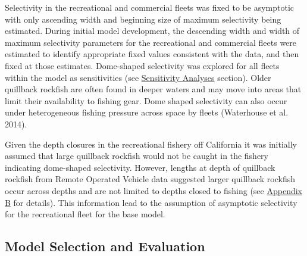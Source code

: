 \documentclass[11pt,
  english,
  a4paper,
]{article}
\begin{document}
\leavevmode\tagmcend\tagstructend\par


Selectivity in the recreational and commercial fleets was fixed to be asymptotic with only ascending width and beginning size of maximum selectivity being estimated. During initial model development, the descending width and width of maximum selectivity parameters for the recreational and commercial fleets were estimated to identify appropriate fixed values consistent with the data, and then fixed at those estimates. Dome-shaped selectivity was explored for all fleets within the model as sensitivities (see {\protect\hyperlink{sensitivity-analyses}{Sensitivity Analyses}\leavevmode\tagmcend\tagstructend} section). Older quillback rockfish are often found in deeper waters and may move into areas that limit their availability to fishing gear. Dome shaped selectivity can also occur under heterogeneous fishing pressure across space by fleets {(Waterhouse et al. 2014)\leavevmode\tagmcend\tagstructend}.

\leavevmode\tagmcend\tagstructend\par


Given the depth closures in the recreational fishery off California it was initially assumed that large quillback rockfish would not be caught in the fishery indicating dome-shaped selectivity. However, lengths at depth of quillback rockfish from Remote Operated Vehicle data suggested larger quillback rockfish occur across depths and are not limited to depths closed to fishing (see {\protect\hyperlink{append_b}{Appendix B}\leavevmode\tagmcend\tagstructend} for details). This information lead to the assumption of asymptotic selectivity for the recreational fleet for the base model.

\leavevmode\tagmcend\tagstructend\par


\hypertarget{model-selection-and-evaluation}{%
\subsection{Model Selection and Evaluation}\label{model-selection-and-evaluation}}
\end{document}
